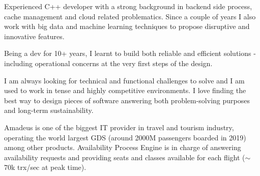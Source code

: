 \documentclass[10pt, a4paper, ragged2e]{altacv}
\begin{document}
\sloppy
{}

\begin{adjustwidth}{-3.7cm}{}
\makecvheader
\end{adjustwidth}

	Experienced C++ developer with a strong background in backend side process, cache management and cloud related problematics. Since a couple of years I also work with big data and machine learning techniques to propose disruptive and innovative features.

	\medskip
	Being a dev for 10+ years, I learnt to build both reliable and efficient solutions - including operational concerns at the very first steps of the design.

	\medskip
	I am always looking for technical and functional challenges to solve and I am used to work in tense and highly competitive environments. I love finding the best way to design pieces of software answering both problem-solving purposes and long-term sustainability.


\bigskip
{}
		
		Amadeus is one of the biggest IT provider in travel and tourism industry, operating the world largest GDS (around 2000M passengers boarded in 2019) among other products.
		Availability Process Engine is in charge of answering availability requests and providing seats and classes available for each flight (${\sim}$70k trx/sec at peak time).
\end{document}
